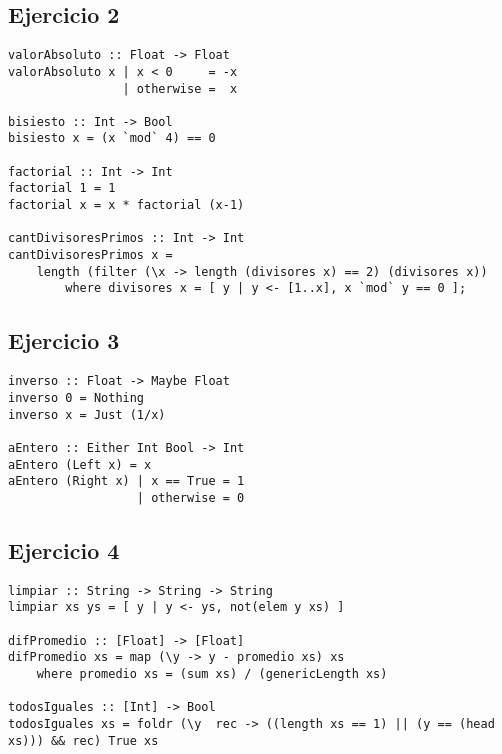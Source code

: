 \subsection{Ejercicio 2}
\begin{centrado}
\begin{verbatim}
valorAbsoluto :: Float -> Float
valorAbsoluto x | x < 0     = -x
                | otherwise =  x

bisiesto :: Int -> Bool
bisiesto x = (x `mod` 4) == 0

factorial :: Int -> Int
factorial 1 = 1
factorial x = x * factorial (x-1)

cantDivisoresPrimos :: Int -> Int
cantDivisoresPrimos x = 
    length (filter (\x -> length (divisores x) == 2) (divisores x))
        where divisores x = [ y | y <- [1..x], x `mod` y == 0 ];
\end{verbatim}
\end{centrado}

\subsection{Ejercicio 3}
\begin{centrado}
\begin{verbatim}
inverso :: Float -> Maybe Float
inverso 0 = Nothing
inverso x = Just (1/x)

aEntero :: Either Int Bool -> Int
aEntero (Left x) = x
aEntero (Right x) | x == True = 1
                  | otherwise = 0
\end{verbatim}
\end{centrado}

\subsection{Ejercicio 4}
\begin{centrado}
\begin{verbatim}
limpiar :: String -> String -> String
limpiar xs ys = [ y | y <- ys, not(elem y xs) ]

difPromedio :: [Float] -> [Float]
difPromedio xs = map (\y -> y - promedio xs) xs 
    where promedio xs = (sum xs) / (genericLength xs)

todosIguales :: [Int] -> Bool
todosIguales xs = foldr (\y  rec -> ((length xs == 1) || (y == (head xs))) && rec) True xs
\end{verbatim}
\end{centrado}

